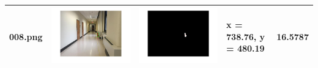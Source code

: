 \documentclass[fleqn,10pt]{SelfArx} %
\begin{document}
\begin{table}
\begin{tabular}{>{\centering\arraybackslash}M{15mm}cc>{\centering\arraybackslash}M{11mm}>{\centering\arraybackslash}M{15mm}}
\vspace{-4cm}008.png & \includegraphics[trim={3cm 2cm 3cm 2cm},clip,scale=0.28]{results/008.jpg} & \includegraphics[trim={3cm 2cm 3cm 2cm},clip,scale=0.28]{results/008s.jpg} & \vspace{-4cm} x = 738.76, y = 480.19 & \vspace{-4cm}16.5787 \\ 
\hline 

\end{tabular}
\end{table}
\end{document}
